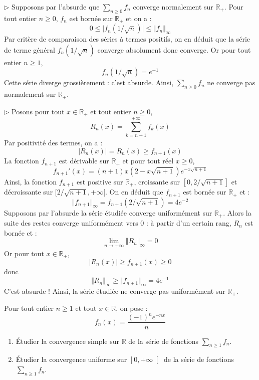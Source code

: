 \documentclass[a4paper,10pt]{report}
\newcommand{\Sum}[2]{\ensuremath{\textstyle{\sum\limits_{#1}^{#2}}}}
\begin{document}
\medskip

\noindent $\rhd$ Supposons par l'absurde que $\Sum{n\geq 0}{} f_n$ converge normalement sur $\mathbb{R}_+$. Pour tout entier $n \geq 0$, $f_n$ est bornée sur $\mathbb{R}_+$ et on a :
$$ 0 \leq \vert f_n(1/\sqrt{n}) \vert \leq \Vert f_n \Vert_{\infty}$$
Par critère de comparaison des séries à termes positifs, on en déduit que la série de terme général $f_n(1/\sqrt{n})$ converge absolument donc converge. Or pour tout entier $n \geq 1$,
 $$ f_n(1/\sqrt{n}) = e^{-1}$$
Cette série diverge grossièrement : c'est absurde. Ainsi, $\Sum{n\geq 0}{} f_n$ ne converge pas normalement sur $\mathbb{R}_+$.

\medskip

\noindent $\rhd$ Posons pour tout $x \in \mathbb{R}_+$ et tout entier $n \geq 0$,
$$ R_n(x) = \sum_{k=n+1}^{+ \infty} f_k(x)$$
Par positivité des termes, on a :
$$ \vert R_n(x) \vert = R_n(x) \geq f_{n+1}(x)$$
La fonction $f_{n+1}$ est dérivable sur $\mathbb{R}_+$ et pour tout réel $x \geq 0$,
$$ f_{n+1}'(x) = (n+1)x (2-x \sqrt{n+1})e^{-x \sqrt{n+1}}$$
Ainsi, la fonction $f_{n+1}$ est positive sur $\mathbb{R}_+$, croissante sur $[0, 2/ \sqrt{n+1}]$ et décroissante sur $[2/\sqrt{n+1}, + \infty[$. On en déduit que $f_{n+1}$ est bornée sur $\mathbb{R}_+$ et :
$$ \Vert f_{n+1} \Vert_{\infty} = f_{n+1}(2/\sqrt{n+1}) = 4 e^{-2}$$
Supposons par l'absurde la série étudiée converge uniformément sur $\mathbb{R}_+$. Alors la suite des restes converge uniformément vers $0$ : à partir d'un certain rang, $R_n$ est bornée et :
$$ \lim_{n \rightarrow + \infty} \Vert R_n \Vert_{ \infty} = 0$$
Or pour tout $x \in \mathbb{R}_+$,
$$  \vert R_n(x) \vert \geq f_{n+1}(x) \geq 0$$
donc 
$$ \Vert R_n \Vert_{\infty} \geq \Vert f_{n+1} \Vert_{\infty} = 4 e^{-1}$$
C'est absurde ! Ainsi, la série étudiée ne converge pas uniformément sur $\mathbb{R}_+$.


\begin{Exercice}{} Pour tout entier $n \geq 1$ et tout $x \in \mathbb{R}$, on pose :
$$ f_n(x) = \dfrac{\left(-1\right)^{n}e^{-nx}}{n} $$

\begin{enumerate}
\item \'Etudier la convergence simple sur $\mathbb{R}$  de la série de fonctions $\Sum{n\geq 1}{} f_n.$
\item \'Etudier la convergence uniforme sur $\left[ 0,+\infty\right[ $  de la série de fonctions $\Sum{n\geq 1}{} f_n.$
\end{enumerate}
\end{Exercice}
\end{document}
